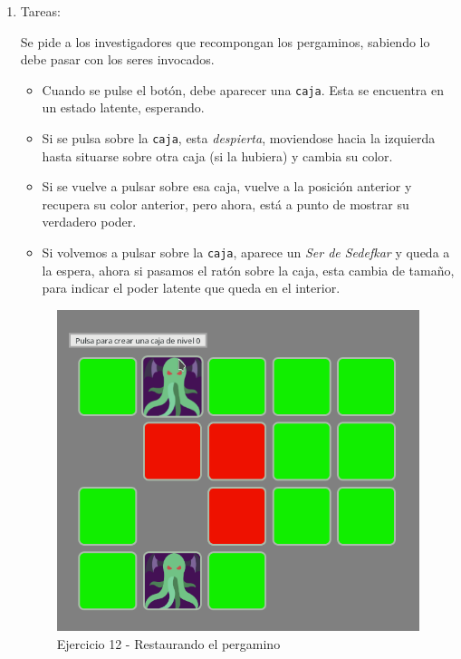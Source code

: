 \documentclass[11pt]{article}
\begin{document}
\begin{enumerate}
\item Tareas:
\label{sec-1-2-12-1}

Se pide a los investigadores que recompongan los pergaminos, sabiendo lo
debe pasar con los seres invocados.

\begin{itemize}
\item Cuando se pulse el botón, debe aparecer una \verb~caja~. Esta se encuentra en un
estado latente, esperando.
\item Si se pulsa sobre la \verb~caja~, esta \emph{despierta}, moviendose hacia la
izquierda hasta situarse sobre otra caja (si la hubiera) y cambia su color.
\item Si se vuelve a pulsar sobre esa caja, vuelve a la posición anterior y
recupera su color anterior, pero ahora, está a punto de mostrar su
verdadero poder.
\item Si volvemos a pulsar sobre la \verb~caja~, aparece un \emph{Ser de Sedefkar} y queda
a la espera, ahora si pasamos el ratón sobre la caja, esta cambia de
tamaño, para indicar el poder latente que queda en el interior.
\end{itemize}


\begin{figure}[!h]
\centering
\includegraphics[width=.9\linewidth]{./imgs/Tarea_12.png}
\caption{\label{fig:restaurandoElPergamino}Ejercicio 12 - Restaurando el pergamino}
\end{figure}
\end{enumerate}
\end{document}
